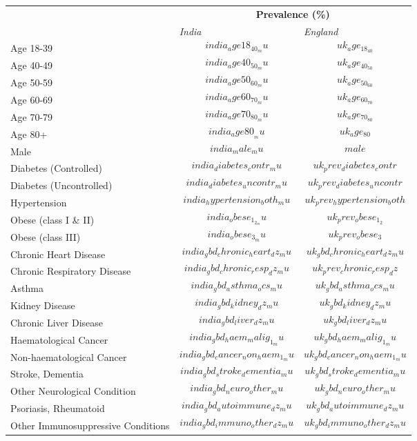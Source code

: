 \begin{tabular}{p{6cm}p{1.1cm}p{1cm}}
& \multicolumn{2}{c}{\textbf{Prevalence (\%)  }} \\[0.5ex] & \emph{India} & \emph{England} \\[2ex]
Age 18-39 & $$india_age18_40_mu$$ & $$uk_age_18_40$$ \\[0.25ex]
Age 40-49 & $$india_age40_50_mu$$ & $$uk_age_40_50$$ \\[0.25ex]
Age 50-59 & $$india_age50_60_mu$$ & $$uk_age_50_60$$\\[0.25ex]
Age 60-69 & $$india_age60_70_mu$$ & $$uk_age_60_70$$\\[0.25ex]
Age 70-79 & $$india_age70_80_mu$$ & $$uk_age_70_80$$\\[0.25ex]
Age 80+ & $$india_age80__mu$$ & $$uk_age_80$$ \\[0.25ex]
Male & $$india_male_mu$$ & $$male$$ \\[0.25ex]
Diabetes (Controlled) & $$india_diabetes_contr_mu$$ & $$uk_prev_diabetes_contr$$ \\[0.25ex]
Diabetes (Uncontrolled) & $$india_diabetes_uncontr_mu$$ & $$uk_prev_diabetes_uncontr$$ \\[0.25ex]
Hypertension & $$india_hypertension_both_mu$$ & $$uk_prev_hypertension_both$$ \\[0.25ex]
Obese (class I \& II) & $$india_obese_1_2_mu$$ & $$uk_prev_obese_1_2$$ \\[0.25ex]
Obese (class III) & $$india_obese_3_mu$$ & $$uk_prev_obese_3$$ \\[0.25ex]
Chronic Heart Disease & $$india_gbd_chronic_heart_dz_mu$$ & $$uk_gbd_chronic_heart_dz_mu$$ \\[0.25ex]
Chronic Respiratory Disease & $$india_gbd_chronic_resp_dz_mu$$ & $$uk_prev_chronic_resp_dz$$ \\[0.25ex]
Asthma & $$india_gbd_asthma_ocs_mu$$ & $$uk_gbd_asthma_ocs_mu$$ \\[0.25ex]
Kidney Disease & $$india_gbd_kidney_dz_mu$$ & $$uk_gbd_kidney_dz_mu$$ \\[0.25ex]
Chronic Liver Disease & $$india_gbd_liver_dz_mu$$ & $$uk_gbd_liver_dz_mu$$ \\[0.25ex]
Haematological Cancer & $$india_gbd_haem_malig_1_mu$$ & $$uk_gbd_haem_malig_1_mu$$\\[0.25ex]
Non-haematological Cancer & $$india_gbd_cancer_non_haem_1_mu$$ & $$uk_gbd_cancer_non_haem_1_mu$$ \\[0.25ex]
Stroke, Dementia & $$india_gbd_stroke_dementia_mu$$ & $$uk_gbd_stroke_dementia_mu$$ \\[0.25ex]
Other Neurological Condition & $$india_gbd_neuro_other_mu$$ & $$uk_gbd_neuro_other_mu$$ \\[0.25ex]
Psoriasis, Rheumatoid & $$india_gbd_autoimmune_dz_mu$$ & $$uk_gbd_autoimmune_dz_mu$$ \\[0.25ex]
Other Immunosuppressive Conditions & $$india_gbd_immuno_other_dz_mu$$ & $$uk_gbd_immuno_other_dz_mu$$ \\[0.25ex]
\end{tabular}
